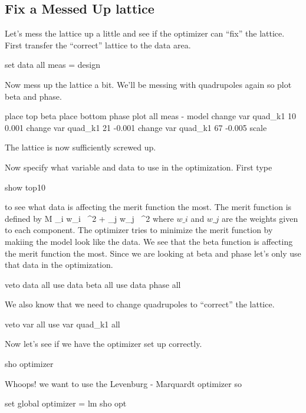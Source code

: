 \subsection{Fix a Messed Up lattice}
\label{ss:fix_it}

Let's mess the lattice up a little and see if the optimizer can ``fix'' the
lattice. First transfer the ``correct'' lattice to the  data area.
\begin{example}
  set data all meas = design
\end{example}
Now mess up the lattice a bit. We'll be messing with quadrupoles again so plot
beta and phase.
\begin{example}
  place top beta
  place bottom phase
  plot all meas - model
  change var quad\_k1 10 0.001
  change var quad\_k1 21 -0.001
  change var quad\_k1 67 -0.005
  scale
\end{example}
The lattice is now sufficiently screwed up.

Now specify what variable and data to use in the optimization. First type
\begin{example}
  show top10
\end{example}
to see what data is affecting the merit function the most. The merit function is
defined by
\Begineq
  {\cal M} \equiv \sum\_{i} w\_i \,
    ^2 + 
  \sum\_{j} w\_j \,
    ^2
  \label{m1}
\Endeq
where $w\_i$ and $w\_j$ are the weights given to each component.
The optimizer tries to minimize the merit function by makiing the model look
like the data. We see that the beta function is affecting the merit function the most. Since we
are looking at beta and phase let's only use that data in the optimization.
\begin{example}
  veto data all
  use  data beta all
  use  data phase all
\end{example}
We also know that we need to change quadrupoles to ``correct'' the lattice.
\begin{example}
  veto var all
  use var quad\_k1 all
\end{example}
Now let's see if we have the optimizer set up correctly.
\begin{example}
  sho optimizer
\end{example}
Whoops! we want to use the Levenburg - Marquardt optimizer so
\begin{example}
  set global optimizer = lm
  sho opt
\end{example}

